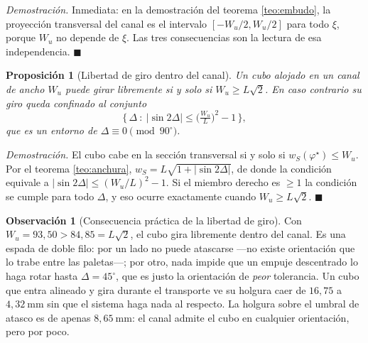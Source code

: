 \documentclass[11pt,a4paper]{article}
\newtheorem{proposicion}[teorema]{Proposición}
\theoremstyle{definition}
\newtheorem{observacion}[teorema]{Observación}
\newenvironment{demo}{\par\noindent\textit{Demostración.}\;}{\hfill$\blacksquare$\par\medskip}
\newcommand{\grados}{^{\circ}}
\begin{document}
\begin{demo}
Inmediata: en la demostración del teorema \ref{teo:embudo}, la proyección transversal del
canal es el intervalo $[-W_u/2, W_u/2]$ para todo $\xi$, porque $W_u$ no depende de
$\xi$. Las tres consecuencias son la lectura de esa independencia.
\end{demo}

\begin{proposicion}[Libertad de giro dentro del canal]
\label{prop:giro-canal}
Un cubo alojado en un canal de ancho $W_u$ puede girar libremente si y solo si
$W_u \ge L\sqrt2$. En caso contrario su giro queda confinado al conjunto
\[
  \Big\{\,\Delta \ :\ \big|\sin 2\Delta\big| \le \Big(\tfrac{W_u}{L}\Big)^{2} - 1 \,\Big\},
\]
que es un entorno de $\Delta \equiv 0 \pmod{90\grados}$.
\end{proposicion}

\begin{demo}
El cubo cabe en la sección transversal si y solo si $w_S(\varphi^\star) \le W_u$. Por el
teorema \ref{teo:anchura}, $w_S = L\sqrt{1+|\sin 2\Delta|}$, de donde la condición
equivale a $|\sin 2\Delta| \le (W_u/L)^2 - 1$. Si el miembro derecho es $\ge 1$ la
condición se cumple para todo $\Delta$, y eso ocurre exactamente cuando
$W_u \ge L\sqrt2$.
\end{demo}

\begin{observacion}[Consecuencia práctica de la libertad de giro]
Con $W_u = 93{,}50 > 84{,}85 = L\sqrt2$, el cubo gira libremente dentro del canal. Es
una espada de doble filo: por un lado no puede atascarse ---no existe orientación que lo
trabe entre las paletas---; por otro, nada impide que un empuje descentrado lo haga rotar
hasta $\Delta = 45\grados$, que es justo la orientación de \emph{peor} tolerancia. Un
cubo que entra alineado y gira durante el transporte ve su holgura caer de
$16{,}75$ a $4{,}32\ \mathrm{mm}$ sin que el sistema haga nada al respecto. La holgura
sobre el umbral de atasco es de apenas $8{,}65\ \mathrm{mm}$: el canal admite el cubo en
cualquier orientación, pero por poco.
\end{observacion}
\end{document}
